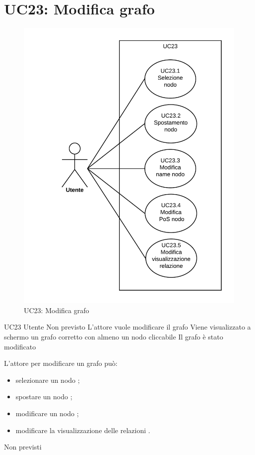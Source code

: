 \documentclass[../AnalisideiRequisiti.tex]{subfiles}
\begin{document}
\section{UC23: Modifica grafo}
\begin{figure}[H]
	\centering
	\includegraphics[width=\textwidth]{../img/UC23.png}
	\caption{UC23: Modifica grafo}
\end{figure}
\UserCase
{UC23}
{Utente}
{Non previsto}
{L'attore vuole modificare il grafo}
{Viene visualizzato a schermo un grafo corretto con almeno un nodo cliccabile }
{Il grafo è stato modificato}
{
	L'attore per modificare un grafo può:
	\begin{itemize}
		\item{} selezionare un nodo ;
		\item{} spostare un nodo ;	
		\item{} modificare un nodo  ;	
		\item{} modificare la visualizzazione delle relazioni .		
	\end{itemize}
}
{Non previsti}
\end{document}
